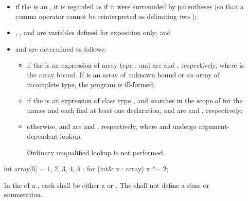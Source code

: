 \begin{itemize}
\item
if the  is an ,
it is regarded as if it were surrounded by parentheses (so that a comma operator
cannot be reinterpreted as delimiting two );

\item {}, , and  are variables defined for
exposition only; and

\item
{} and  are determined as follows:
\begin{itemize}
\item if the  is an expression of
array type ,  and  are
 and  \tcode{+} , respectively,
where  is
the array bound. If  is an array of unknown bound or an array of
incomplete type, the program is ill-formed;

\item if the  is
an expression of class type , and
searches in the scope of 
for the names  and 
each find at least one declaration,
 and  are
 and ,
respectively;

\item otherwise,  and  are
 and , respectively,
where  and  undergo
argument-dependent lookup.
\begin{note}
Ordinary unqualified lookup is not
performed.
\end{note}
\end{itemize}
\end{itemize}

\begin{example}
\begin{codeblock}
int array[5] = { 1, 2, 3, 4, 5 };
for (int& x : array)
  x *= 2;
\end{codeblock}
\end{example}

\pnum
In the  of a ,
each  shall be either a 
or . The  shall not define a
class or enumeration.%

